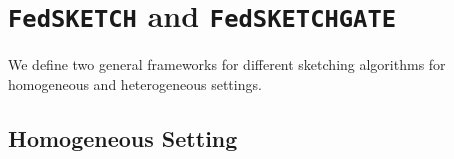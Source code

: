 \documentclass{article}
\begin{document}
\vspace{-0.05in}
\section{\texttt{FedSKETCH} and \texttt{FedSKETCHGATE}}\label{sec:algos}
\vspace{-0.05in}
We define two general frameworks for different sketching algorithms for homogeneous and heterogeneous settings.
\vspace{-0.05in}
\subsection{Homogeneous Setting}
\vspace{-0.05in}

\end{document}
